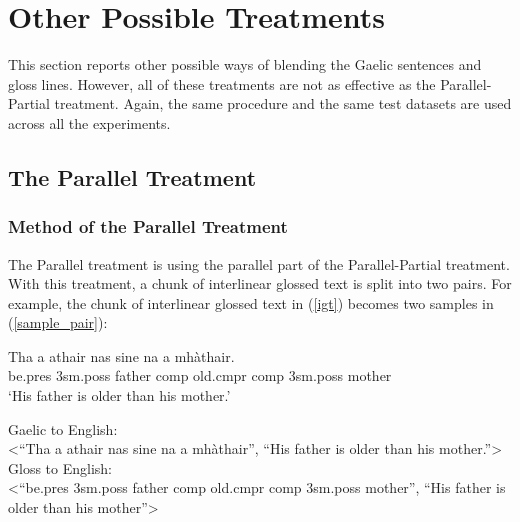 \documentclass[final]{ua-thesis}
\numberwithin{equation}{section}
\begin{document}
\section{Other Possible Treatments}
This section reports other possible ways of blending the Gaelic sentences and gloss lines. However, all of these treatments are not as effective as the Parallel-Partial treatment. Again, the same procedure and the same test datasets are used across all the experiments.    

\subsection{The Parallel Treatment}\label{treatment:Para}
\subsubsection{Method of the Parallel Treatment}
The Parallel treatment is using the parallel part of the Parallel-Partial treatment. With this treatment, a chunk of interlinear glossed text is split into two pairs. For example, the chunk of interlinear glossed text in (\ref{igt}) becomes two samples in (\ref{sample_pair}): 
\begin{exe} 
\ex \label{igt}
	\gll    Tha a athair nas sine na a mh\`athair.\\  
            be.pres 3sm.poss father comp old.cmpr comp 3sm.poss mother \\
    \glt    `His father is older than his mother.'  
\end{exe}


\begin{exe} 
	\ex \label{sample_pair}
	\begin{xlist}
		\ex Gaelic to English: \\<``Tha a athair nas sine na a mh\`athair'', ``His father is older than his mother.''>
		\ex Gloss to English: \\<``be.pres 3sm.poss father comp old.cmpr comp 3sm.poss mother'', ``His father is older than his mother''>
	\end{xlist}
\end{exe}
\end{document}
